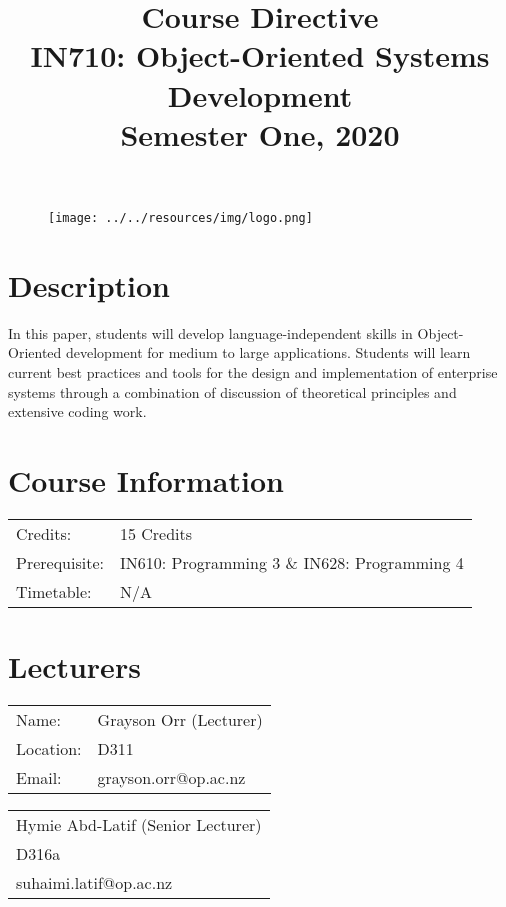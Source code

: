 \documentclass{article}
\author{}
\begin{document}
\begin{figure}
	\texttt{[image: ../../resources/img/logo.png]}
\end{figure}

\title{Course Directive\\IN710: Object-Oriented Systems Development\\Semester One, 2020}
\date{}
\maketitle

\section*{Description}
In this paper, students will develop language-independent skills in Object-Oriented development for medium to large applications. Students will learn current best practices and tools for the design and implementation of enterprise systems through a combination of discussion of theoretical principles and extensive coding work.

\section*{Course Information}
\begin{tabular}{ll}
	Credits:      & 15 Credits                                   \\
	Prerequisite: & IN610: Programming 3 \& IN628: Programming 4 \\
	Timetable:    & N/A                                          \\
\end{tabular}

\section*{Lecturers}
\begin{tabular}{ll}
	Name:     & Grayson Orr (Lecturer) \\
	Location: & D311                   \\
	Email:    & grayson.orr@op.ac.nz   \\
\end{tabular}
\begin{tabular}{l}
	Hymie Abd-Latif (Senior Lecturer) \\
	D316a                             \\
	suhaimi.latif@op.ac.nz            \\
\end{tabular}
\end{document}
